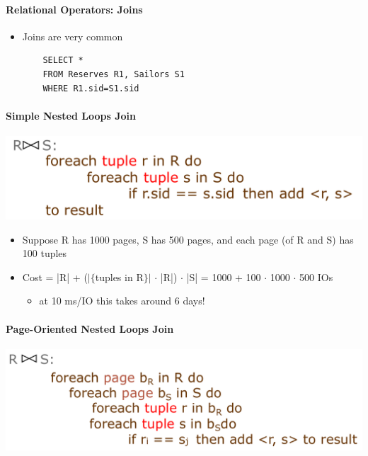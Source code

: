 \paragraph{Relational Operators: Joins}
\begin{itemize}
\item Joins are very common

  \begin{lstlisting}
    SELECT *
    FROM Reserves R1, Sailors S1
    WHERE R1.sid=S1.sid
  \end{lstlisting}

\end{itemize}

\paragraph{Simple Nested Loops Join}

\includegraphics[scale=0.2]{graphics/nested-loop-join.png}

\begin{itemize}
\item Suppose R has 1000 pages, S has 500 pages, and each
  page (of R and S) has 100 tuples
\item Cost = |R| + ($|\{$tuples in R$\}|$ $\cdot$ |R|) $\cdot$ |S|
  = 1000 + 100 $\cdot$ 1000 $\cdot$ 500 IOs
  \begin{itemize}
  \item at 10 ms/IO this takes around 6 days!
  \end{itemize}
\end{itemize}

\paragraph{Page-Oriented Nested Loops Join}

\includegraphics[scale=0.2]{graphics/page-oriented-nested-loop-join.png}

